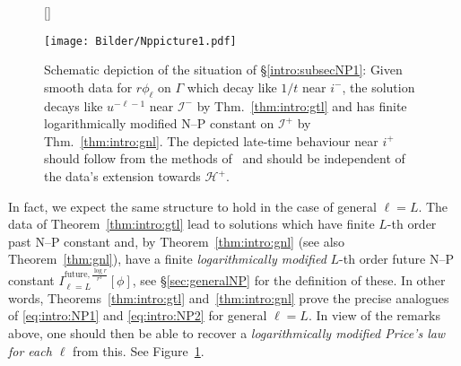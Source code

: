 \documentclass[11pt,english]{article}
\numberwithin{equation}{section}
\theoremstyle{remark}
\theoremstyle{plain}
\theoremstyle{remark}
\renewcommand{\(}{\left(}
\renewcommand{\)}{\right)}
\begin{document}
\begin{figure}[htbp]
[\FBwidth]
{\caption{Schematic depiction of the situation of \S \ref{intro:subsecNP1}: Given smooth data for $r\phi_\ell$ on $\Gamma$ which decay like $1/t$ near $i^-$, the solution decays like $u^{-\ell-1}$ near $\mathcal I^-$ by Thm.~\ref{thm:intro:gtl} and has finite logarithmically modified N--P constant on $\mathcal I^+$ by Thm.~\ref{thm:intro:gnl}. The depicted late-time behaviour near $i^+$ should follow from the methods of~\cite{AAG21} and should be independent of the data's extension towards $\mathcal H^+$.}\label{fig:III:1}}
{\texttt{[image: Bilder/Nppicture1.pdf]}}
\end{figure}

In fact, we expect the same structure to hold in the case of general $\ell=L$. The data of Theorem~\ref{thm:intro:gtl} lead to solutions which have finite $L$-th order past N--P constant and, by Theorem~\ref{thm:intro:gnl} (see also Theorem~\ref{thm:gnl}), have a finite \textit{logarithmically modified} $L$-th order future N--P constant $I_{\ell=L}^{ \mathrm{future},\frac{\log r}{r^3}}[\phi]$, see  \S \ref{sec:generalNP} for the definition of these.
 In other words, Theorems~\ref{thm:intro:gtl} and~\ref{thm:intro:gnl} prove the precise analogues of \eqref{eq:intro:NP1} and \eqref{eq:intro:NP2} for general $\ell=L$. 
In view of the remarks above, one should then be able to recover a \textit{logarithmically modified Price's law {for each $\ell$}} from this. See Figure~\ref{fig:III:1}. 
\end{document}
